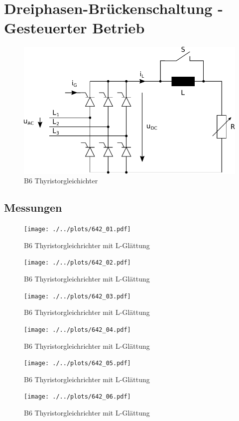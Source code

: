 \section{Dreiphasen-Brückenschaltung - Gesteuerter Betrieb}

\begin{figure}[h!]
    \centering
    \includegraphics[scale=\sscale]{./../fig/b6_thyristor.pdf}
    \caption{B6 Thyristorgleichichter}
    \label{fig:b6_thyristor}
\end{figure}

\subsection{Messungen}

\begin{figure}[h!]
    \centering
    \texttt{[image: ./../plots/642\_01.pdf]}
    \caption{B6 Thyristorgleichrichter mit L-Glättung}
\end{figure}

\begin{figure}[h!]
    \centering
    \texttt{[image: ./../plots/642\_02.pdf]}
    \caption{B6 Thyristorgleichrichter mit L-Glättung}
\end{figure}

\begin{figure}[h!]
    \centering
    \texttt{[image: ./../plots/642\_03.pdf]}
    \caption{B6 Thyristorgleichrichter mit L-Glättung}
\end{figure}

\begin{figure}[h!]
    \centering
    \texttt{[image: ./../plots/642\_04.pdf]}
    \caption{B6 Thyristorgleichrichter mit L-Glättung}
\end{figure}

\begin{figure}[h!]
    \centering
    \texttt{[image: ./../plots/642\_05.pdf]}
    \caption{B6 Thyristorgleichrichter mit L-Glättung}
\end{figure}

\begin{figure}[h!]
    \centering
    \texttt{[image: ./../plots/642\_06.pdf]}
    \caption{B6 Thyristorgleichrichter mit L-Glättung}
\end{figure}

\clearpage

